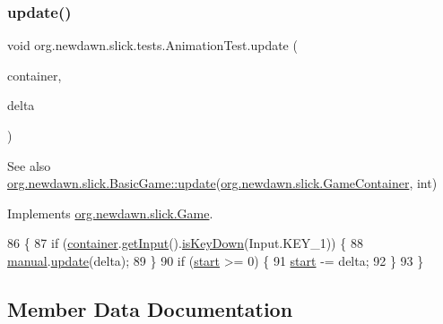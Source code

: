 \subsubsection{\texorpdfstring{update()}{update()}}
{\footnotesize\ttfamily void org.\+newdawn.\+slick.\+tests.\+Animation\+Test.\+update (\begin{DoxyParamCaption}\item[{\mbox{\hyperlink{classorg_1_1newdawn_1_1slick_1_1_game_container}{Game\+Container}}}]{container,  }\item[{int}]{delta }\end{DoxyParamCaption})\hspace{0.3cm}{\ttfamily [inline]}}

\begin{DoxySeeAlso}{See also}
\mbox{\hyperlink{classorg_1_1newdawn_1_1slick_1_1_basic_game_acfe6fa05aef83bff1631af91a3e4bd20}{org.\+newdawn.\+slick.\+Basic\+Game\+::update}}(\mbox{\hyperlink{classorg_1_1newdawn_1_1slick_1_1_game_container}{org.\+newdawn.\+slick.\+Game\+Container}}, int) 
\end{DoxySeeAlso}


Implements \mbox{\hyperlink{interfaceorg_1_1newdawn_1_1slick_1_1_game_ab07b2e9463ee4631620dde0de25bdee8}{org.\+newdawn.\+slick.\+Game}}.


\begin{DoxyCode}
86                                                            \{
87         \textcolor{keywordflow}{if} (\mbox{\hyperlink{classorg_1_1newdawn_1_1slick_1_1tests_1_1_animation_test_ad2142f4fe5667df82eb8ead44f81e1b1}{container}}.\mbox{\hyperlink{classorg_1_1newdawn_1_1slick_1_1_game_container_a6042fd06c54872f9f791bd33beffec88}{getInput}}().\mbox{\hyperlink{classorg_1_1newdawn_1_1slick_1_1_input_a2b904c85a112a9c531457c465f366ca8}{isKeyDown}}(Input.KEY\_1)) \{
88             \mbox{\hyperlink{classorg_1_1newdawn_1_1slick_1_1tests_1_1_animation_test_a3f8e79b4500cfad2ae6939b2fe0794b0}{manual}}.\mbox{\hyperlink{classorg_1_1newdawn_1_1slick_1_1_animation_a24420dcd4e89ff617ed52a265e014ba5}{update}}(delta);
89         \}
90         \textcolor{keywordflow}{if} (\mbox{\hyperlink{classorg_1_1newdawn_1_1slick_1_1tests_1_1_animation_test_af5b346538d97a71ad4a8a1feb69dfa2f}{start}} >= 0) \{
91             \mbox{\hyperlink{classorg_1_1newdawn_1_1slick_1_1tests_1_1_animation_test_af5b346538d97a71ad4a8a1feb69dfa2f}{start}} -= delta;
92         \}
93     \}
\end{DoxyCode}


\subsection{Member Data Documentation}
\mbox{\label{classorg_1_1newdawn_1_1slick_1_1tests_1_1_animation_test_a1481626a35452ac4fd6b535c7a3c3afc}} 
